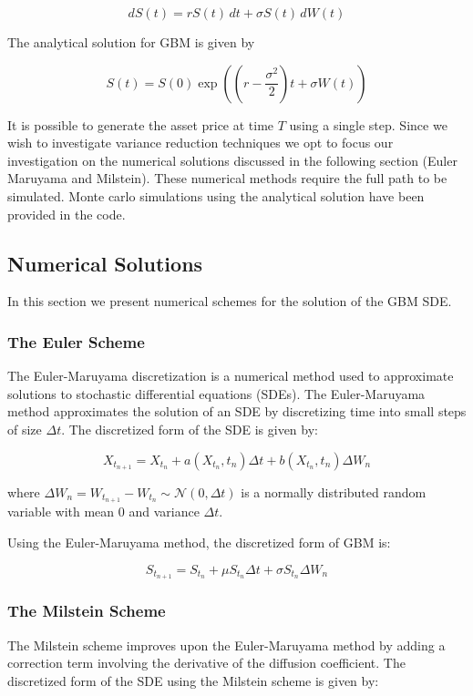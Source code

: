 \documentclass{article}
\newcommand{\para}{\vspace{8pt}} %
\begin{document}
\[
dS(t) = r S(t) \, dt + \sigma S(t) \, dW(t)
\]

The analytical solution for GBM is given by

\[
S(t) = S(0) \exp \left( \left( r - \frac{\sigma^2}{2} \right) t + \sigma W(t) \right)
\]

It is possible to generate the asset price at time $T$ using a single step. Since we wish to investigate variance reduction techniques 
we opt to focus our investigation on the numerical solutions discussed in the following section (Euler Maruyama and Milstein). These numerical methods
require the full path to be simulated. Monte carlo simulations using the analytical solution have been provided in the code.

\subsection{Numerical Solutions}

In this section we present numerical schemes for the solution of the GBM SDE. 

\subsubsection{The Euler Scheme}

The Euler-Maruyama discretization is a numerical method used to approximate solutions to stochastic differential equations (SDEs). The Euler-Maruyama method approximates 
the solution of an SDE by discretizing time into small steps of size $\Delta t$. The discretized form of the SDE is given by:

\[
X_{t_{n+1}} = X_{t_n} + a(X_{t_n}, t_n) \Delta t + b(X_{t_n}, t_n) \Delta W_n
\]

where $\Delta W_n = W_{t_{n+1}} - W_{t_n} \sim \mathcal{N}(0, \Delta t)$ is a normally distributed random variable with mean 0 and variance $\Delta t$.

\para
Using the Euler-Maruyama method, the discretized form of GBM is:

\[
S_{t_{n+1}} = S_{t_n} + \mu S_{t_n} \Delta t + \sigma S_{t_n} \Delta W_n
\]

\subsubsection{The Milstein Scheme}

The Milstein scheme improves upon the Euler-Maruyama method by adding a correction term involving the derivative of the diffusion coefficient. 
The discretized form of the SDE using the Milstein scheme is given by:
\end{document}
